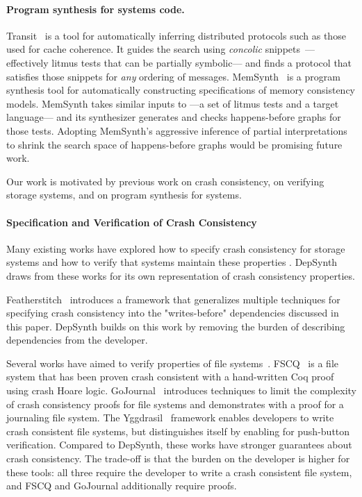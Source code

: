\paragraph{Program synthesis for systems code.}
Transit~\cite{udupa:transit} is a tool for automatically inferring distributed protocols
such as those used for cache coherence.
It guides the search using \emph{concolic} snippets~\cite{sen:concolic}---%
effectively litmus tests that can be partially symbolic---%
and finds a protocol that satisfies those snippets for \emph{any} ordering of messages.
MemSynth~\cite{bornholt:memsynth} is a program synthesis tool for
automatically constructing specifications of memory consistency models.
MemSynth takes similar inputs to \depsynth---a set of litmus tests and a target language---%
and its synthesizer generates and checks happens-before graphs for those tests.
Adopting MemSynth's aggressive inference of partial interpretations~\cite{torlak:kodkod}
to shrink the search space of happens-before graphs would be promising future work.


Our work is motivated by previous work on crash consistency,
on verifying storage systems, and on program synthesis for systems.

\paragraph{Specification and Verification of Crash Consistency}
Many existing works have explored how to specify crash consistency
for storage systems and how to verify that systems maintain
these properties .
DepSynth draws from these works for its own
representation of crash consistency properties.

Featherstitch~ \cite{frost:featherstitch} introduces a framework that generalizes 
multiple techniques for specifying crash consistency into the
"writes-before" dependencies discussed in this paper.
DepSynth builds on this work by removing the burden of describing
dependencies from the developer.

Several works have aimed to verify properties of file
systems~\cite{amani:cogent,schellhorn:flashix}.
FSCQ~\cite{chen:fscq} is a file system that has been proven crash consistent
with a hand-written Coq proof using crash Hoare logic.
GoJournal~\cite{chajed:go-journal} introduces techniques to limit the complexity of
crash consistency proofs for file systems
and demonstrates with a proof for a journaling file system.
The Yggdrasil~\cite{sigurbjarnarson:yggdrasil} framework enables developers to write crash consistent
file systems, but distinguishes itself by enabling for push-button
verification. Compared to DepSynth, these works have stronger guarantees
about crash consistency.
The trade-off is that the burden on the developer is higher for these tools:
all three require the developer to write a crash consistent file system,
and FSCQ and GoJournal additionally require proofs.

